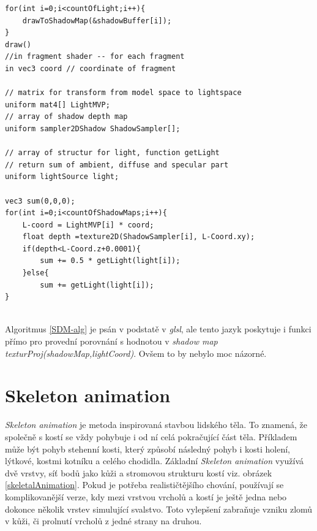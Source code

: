 \lstset{frame = single, language=C++, framexleftmargin=15pt,label="Algoritmus"}

\begin{lstlisting}[caption=Algoritmus Shadow depth map]
for(int i=0;i<countOfLight;i++){
	drawToShadowMap(&shadowBuffer[i]);
}
draw()
//in fragment shader -- for each fragment
in vec3 coord // coordinate of fragment

// matrix for transform from model space to lightspace
uniform mat4[] LightMVP;	
// array of shadow depth map
uniform sampler2DShadow ShadowSampler[];

// array of structur for light, function getLight
// return sum of ambient, diffuse and specular part
uniform lightSource light;

vec3 sum(0,0,0);
for(int i=0;i<countOfShadowMaps;i++){
	L-coord = LightMVP[i] * coord;
	float depth =texture2D(ShadowSampler[i], L-Coord.xy);
	if(depth<L-Coord.z+0.0001){
		sum += 0.5 * getLight(light[i]);
	}else{
		sum += getLight(light[i]);	
}
	
\end{lstlisting}\label{SDM-alg}
Algoritmus \ref{SDM-alg} je psán v podstatě v \emph{glsl}, ale tento jazyk poskytuje i funkci přímo pro provední porovnání s hodnotou v \emph{shadow map} \emph{texturProj(shadowMap,lightCoord)}. Ovšem to by nebylo moc názorné.
\section{Skeleton animation}\label{SA}
\emph{Skeleton animation }je metoda inspirovaná stavbou lidského těla. To znamená, že společně s kostí se vždy pohybuje i od ní celá pokračující část těla. Příkladem může být pohyb stehenní kosti, který způsobí následný pohyb i kosti holení, lýtkové, kostmi kotníku a celého chodidla. Základní \emph{Skeleton animation} využívá dvě vrstvy, síť bodů jako kůži a stromovou strukturu kostí viz. obrázek \ref{skeletalAnimation}.
Pokud je potřeba realističtějšího chování, používají se komplikovanější verze, kdy mezi vrstvou vrcholů a kostí je ještě jedna nebo dokonce několik vrstev simulující svalstvo. Toto vylepšení zabraňuje vzniku zlomů v kůži, či prolnutí vrcholů z jedné strany na druhou.

